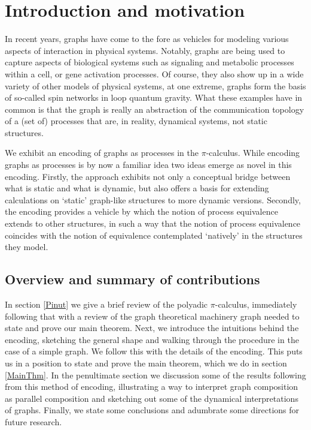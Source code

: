 \documentclass[]{llncs}
\begin{document}

\section{Introduction and motivation}

In recent years, graphs have come to the fore as vehicles for modeling
various aspects of interaction in physical systems. Notably, graphs
are being used to capture aspects of biological systems such as
signaling and metabolic processes within a cell, or gene activation
processes. Of course, they also show up in a wide variety of other
models of physical systems, at one extreme, graphs form the basis of
so-called spin networks in loop quantum gravity. What these examples
have in common is that the graph is really an abstraction of the
communication topology of a (set of) processes that are, in reality,
dynamical systems, not static structures.
  
We exhibit an encoding of graphs as processes in the
$\pi$-calculus. While encoding graphs as processes is by now a
familiar idea two ideas emerge as novel in this encoding. Firstly, the
approach exhibits not only a conceptual bridge between what is static
and what is dynamic, but also offers a basis for extending
calculations on `static' graph-like structures to more dynamic
versions. Secondly, the encoding provides a vehicle by which the
notion of process equivalence extends to other structures, in such a
way that the notion of process equivalence coincides with the notion
of equivalence contemplated `natively' in the structures they model.

\subsection{Overview and summary of contributions}

In section \ref{Pinut} we give a brief review of the polyadic
$\pi$-calculus, immediately following that with a review of the graph
theoretical machinery graph needed to state and prove our main
theorem. Next, we introduce the intuitions behind the encoding,
sketching the general shape and walking through the procedure in the
case of a simple graph. We follow this with the details of the
encoding. This puts us in a position to state and prove the main
theorem, which we do in section \ref{MainThm}. In the penultimate
section we discussion some of the results following from this method
of encoding, illustrating a way to interpret graph composition as
parallel composition and sketching out some of the dynamical
interpretations of graphs. Finally, we state some conclusions and
adumbrate some directions for future research.
\end{document}

